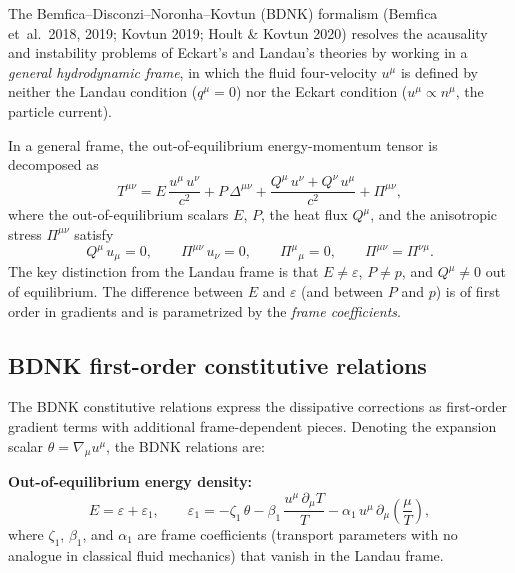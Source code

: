 The Bemfica--Disconzi--Noronha--Kovtun (BDNK) formalism
(Bemfica et~al.\ 2018, 2019; Kovtun 2019; Hoult \& Kovtun 2020)
resolves the acausality and instability problems of Eckart's and
Landau's theories by working in a \emph{general hydrodynamic frame},
in which the fluid four-velocity $u^{\mu}$ is defined by neither the
Landau condition ($q^{\mu} = 0$) nor the Eckart condition
($u^{\mu} \propto n^{\mu}$, the particle current).

In a general frame, the out-of-equilibrium energy-momentum tensor is
decomposed as
\begin{equation}
  T^{\mu\nu} = E\,\frac{u^{\mu}\,u^{\nu}}{c^{2}}
    + P\,\Delta^{\mu\nu}
    + \frac{Q^{\mu}\,u^{\nu} + Q^{\nu}\,u^{\mu}}{c^{2}}
    + \Pi^{\mu\nu},
  \label{eq:bdnk-emt-decomp}
\end{equation}
where the out-of-equilibrium scalars $E$, $P$, the heat flux
$Q^{\mu}$, and the anisotropic stress $\Pi^{\mu\nu}$ satisfy
\begin{equation}
  Q^{\mu}\, u_{\mu} = 0,
  \qquad
  \Pi^{\mu\nu}\, u_{\nu} = 0,
  \qquad
  \Pi^{\mu}{}_{\mu} = 0,
  \qquad
  \Pi^{\mu\nu} = \Pi^{\nu\mu}.
  \label{eq:bdnk-constraints}
\end{equation}
The key distinction from the Landau frame is that $E \neq \varepsilon$,
$P \neq p$, and $Q^{\mu} \neq 0$ out of equilibrium.  The difference
between $E$ and $\varepsilon$ (and between $P$ and $p$) is of
first order in gradients and is parametrized by the \emph{frame
coefficients}.

\subsection{BDNK first-order constitutive relations}
\label{sec:bdnk-constitutive}

The BDNK constitutive relations express the dissipative corrections
as first-order gradient terms with additional frame-dependent pieces.
Denoting the expansion scalar $\theta = \nabla_{\mu}u^{\mu}$, the
BDNK relations are:

\medskip\noindent
\textbf{Out-of-equilibrium energy density:}
\begin{equation}
  E = \varepsilon + \varepsilon_{1},
  \qquad
  \varepsilon_{1}
    = -\zeta_{1}\,\theta
      - \beta_{1}\,\frac{u^{\mu}\,\partial_{\mu} T}{T}
      - \alpha_{1}\,u^{\mu}\,\partial_{\mu}\!\left(\frac{\mu}{T}\right),
  \label{eq:bdnk-energy-corr}
\end{equation}
where $\zeta_1$, $\beta_1$, and $\alpha_1$ are frame coefficients
(transport parameters with no analogue in classical fluid mechanics)
that vanish in the Landau frame.

